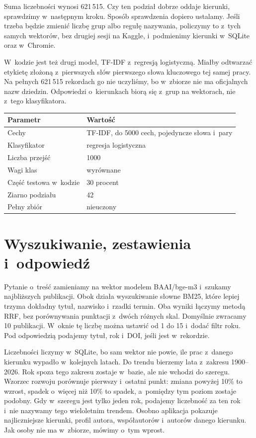 \documentclass[11pt,a4paper]{article}
\begin{document}
Suma liczebności wynosi 621\,515. Czy ten podział dobrze oddaje kierunki, sprawdzimy w~następnym kroku. Sposób sprawdzenia dopiero ustalamy. Jeśli trzeba będzie zmienić liczbę grup albo regułę nazywania, policzymy to z~tych samych wektorów, bez drugiej sesji na Kaggle, i~podmienimy kierunki w~SQLite oraz w~Chromie.

W~kodzie jest też drugi model, TF-IDF z~regresją logistyczną. Miałby odtwarzać etykietę złożoną z~pierwszych słów pierwszego słowa kluczowego tej samej pracy. Na pełnych 621\,515 rekordach go nie uczyliśmy, bo w~zbiorze nie ma oficjalnych nazw dziedzin. Odpowiedzi o~kierunkach biorą się z~grup na wektorach, nie z~tego klasyfikatora.

\begin{center}
\begin{tabularx}{\textwidth}{|L{0.36\textwidth}|Y|}
\hline
\textbf{Parametr} & \textbf{Wartość} \\
\hline
Cechy & TF-IDF, do 5000 cech, pojedyncze słowa i~pary \\
\hline
Klasyfikator & regresja logistyczna \\
\hline
Liczba przejść & 1000 \\
\hline
Wagi klas & wyrównane \\
\hline
Część testowa w~kodzie & 30 procent \\
\hline
Ziarno podziału & 42 \\
\hline
Pełny zbiór & nieuczony \\
\hline
\end{tabularx}
\end{center}

\section*{Wyszukiwanie, zestawienia i~odpowiedź}

Pytanie o~treść zamieniamy na wektor modelem BAAI/bge-m3 i~szukamy najbliższych publikacji. Obok działa wyszukiwanie słowne BM25, które lepiej trzyma dokładny tytuł, nazwisko i~rzadki termin. Oba wyniki łączymy metodą RRF, bez porównywania punktacji z~dwóch różnych skal. Domyślnie zwracamy 10 publikacji. W~oknie tę liczbę można ustawić od 1 do 15 i~dodać filtr roku. Pod odpowiedzią podajemy tytuł, rok i~DOI, jeśli jest w~rekordzie.

Liczebności liczymy w~SQLite, bo sam wektor nie powie, ile prac z~danego kierunku wypadło w~kolejnych latach. Do trendu bierzemy lata z~zakresu 1900--2026. Rok spoza tego zakresu zostaje w~bazie, ale nie wchodzi do szeregu. Wzorzec rozwoju porównuje pierwszy i~ostatni punkt: zmiana powyżej 10\% to wzrost, spadek o~więcej niż 10\% to spadek, a~pomiędzy tym poziom zostaje podobny. Gdy w~szeregu jest tylko jeden rok, podajemy liczebność za ten rok i~nie nazywamy tego wieloletnim trendem. Osobno aplikacja pokazuje najliczniejsze kierunki, profil autora, współautorów i~autorów danego kierunku. Jak osoby nie ma w~zbiorze, mówimy o~tym wprost.
\end{document}
